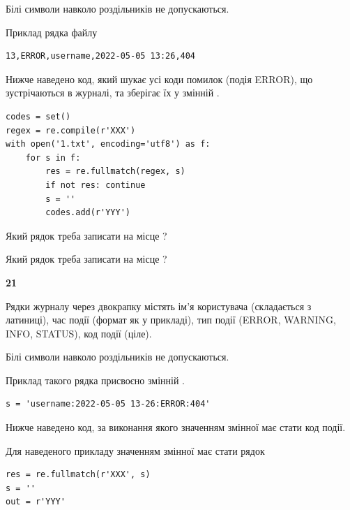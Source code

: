 Білі символи навколо роздільників не допускаються.

Приклад рядка файлу



\begin{verbatim}
13,ERROR,username,2022-05-05 13:26,404
\end{verbatim}


Нижче наведено код, який шукає усі коди помилок (подія ERROR), що зустріча\-ють\-ся в журналі, та зберігає їх у змінній .



\begin{verbatim}
codes = set()
regex = re.compile(r'XXX')
with open('1.txt', encoding='utf8') as f:
    for s in f:
        res = re.fullmatch(regex, s)
        if not res: continue
        s = ''
        codes.add(r'YYY')
\end{verbatim}





Який рядок треба записати на місце  ?\par
\vspace{5mm}


Який рядок треба записати на місце  ?\par


\newpage

{\begin {center}\textbf{ 21}\end {center}}\par
Рядки журналу через двокрапку містять ім'я користувача (складається з латиниці), час події (фор\-мат як у прикладі), тип події (ERROR, WARNING, INFO, STATUS), код події (ціле).

Білі символи навколо роздільників не допускаються.

Приклад такого рядка присвоєно змінній .



\begin{verbatim}
s = 'username:2022-05-05 13-26:ERROR:404'
\end{verbatim}


Нижче наведено код, за виконання якого значенням змінної  має стати код події.

Для наведеного прикладу значенням змінної  має стати рядок 



\begin{verbatim}
res = re.fullmatch(r'XXX', s)
s = ''
out = r'YYY'
\end{verbatim}


